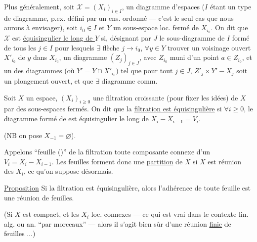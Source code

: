 Plus généralement, soit $\mathcal X=(X_i)_{i\in I}$, un diagramme d'espaces ($I$ étant un type de diagramme, p.ex. défini par un ens. ordonné --- c'est le seul cas que nous aurons à envisager), soit $i_0\in I$ et $Y$ un sous-espace loc. fermé de $X_{i_0}$. On dit que $\mathcal X$ est \uline{équisingulier le long de $Y$} si, désignant par $J$ le sous-diagramme de $I$ formé de tous les $j\in I$ pour lesquels  $\exists$ flèche $j\longrightarrow i_0$, $\forall y\in Y$  trouver un voisinage ouvert $X'_{i_0}$ de $y$ dans $X_{i_0}$, un diagramme  $(Z_j)_{j\in J}$, avec $Z_{i_0}$ muni d'un point $a\in Z_{i_0}$, et un  des diagrammes (où $Y'=Y\cap X'_{i_0}$)
tel que pour tout $j\in J$, $Z'_j\times Y' - X_j$ soit un plongement ouvert, et que $\exists$ diagramme comm.

Soit $X$ un espace, $(X_i)_{i\geq0}$ une filtration croissante (pour fixer les idées) de $X$ par des sous-espaces fermés. On dit que la \uline{filtration est équisingulière} si $\forall i\geq0$, le diagramme formé de
est équisingulier le long de $X_i-X_{i-1}=V_i$.

(NB on pose $X_{-1}=\varnothing$).

Appelons ``feuille ()'' de la filtration toute composante connexe d'un $V_i=X_i-X_{i-1}$.
Les feuilles  forment donc une \uline{partition} de $X$ si $X$ est réunion des $X_i$, ce qu'on suppose désormais.

\uline{Proposition} Si la  filtration est équisingulière, alors l'adhérence de toute feuille est une réunion de feuilles.

(Si $X$ est compact, et les $X_i$ loc. connexes --- ce qui est vrai dans le contexte lin.  alg. ou an. ``par morceaux'' --- alors il s'agit bien sûr d'une réunion \uline{finie} de feuilles $\ldots$)

